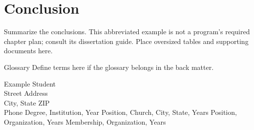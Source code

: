 \documentclass[dissertation,font=termes]{mbts}
\begin{document}
\chapter{Conclusion}
Summarize the conclusions. This abbreviated example is not a program's
required chapter plan; consult its dissertation guide.
Place oversized tables and supporting documents here.
\begin{mbtspage}{Glossary}
Define terms here if the glossary belongs in the back matter.
\end{mbtspage}
\begin{mbtsbibliography}
\end{mbtsbibliography}
\begin{mbtsvita}
Example Student\\Street Address\\City, State ZIP\\Phone
{}
Degree, Institution, Year
Position, Church, City, State, Years
Position, Organization, Years
Membership, Organization, Years
\end{mbtsvita}
\end{document}
